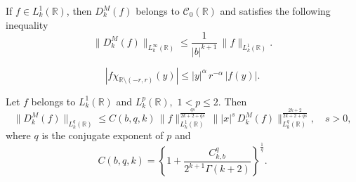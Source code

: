 \documentclass[10pt,a4paper]{amsart}
\begin{document}
\begin{lemma} \label{le:3.1} If $f\in L_k^1(\mathbb{R})$, then  $D_k^M(f)$ belongs to $\mathcal{C}_0(\mathbb{R})$ and satisfies the following inequality 
\begin{equation*} \label{e:2.4}
    \|D_k^M(f)\|_{L_k^\infty(\mathbb{R})} \le \frac{1}{|b|^{k+1}}\, \|f\|_{L_k^1(\mathbb{R})}.
\end{equation*}
\end{lemma}

\begin{equation}\label{5.1}
 |f \chi_{{\mathbb{R}}\setminus(-r,r)}(y)|\le |y|^\alpha\,r^{-\alpha}\,|f(y)|.   
\end{equation}

 \begin{theorem}\label{Th:3.4}
Let  $f$ belongs to $ L
 _k^1(\mathbb{R})$ and $L^p_k(\mathbb{R}), \,\, 1<p\le 2$. Then 
 \begin{equation*}
 \|D_k^M(f)\|_{L_k^{q}(\mathbb{R})} \le C(b,q,k) \, \|f\|_{L_k^1(\mathbb{R})}^{\frac{qs}{2k+2+qs}}\, \||x|^s\,D_k^M(f)\|_{L_k^{q}(\mathbb{R})}^{\frac{2k+2}{2k+2+qs}}, \quad s>0,
 \end{equation*}
 where $q$ is the conjugate exponent of $p$ and $$C(b,q,k) = \left \{ 1+\frac{C_{k,b}^q}{2^{k+1}\Gamma(k+2)}\right\}^{\frac{1}{q }}.$$
 \end{theorem}
\end{document}
